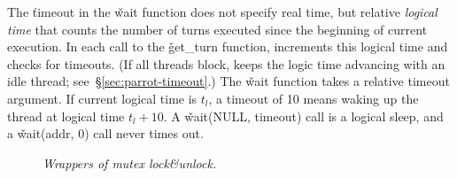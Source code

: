 
The \v{timeout} in the \v{wait} function does not specify real time, but relative \emph{logical time} that
counts the number of turns executed since the beginning of current
execution.  In each call to the \v{get\_turn} function, \parrot increments this logical
time and checks for timeouts. 
(If all threads block, \parrot keeps the logic time advancing with an idle
thread; see~\S\ref{sec:parrot-timeout}.)
The \v{wait} function takes a relative timeout argument.  If
current logical time is $t_l$, a timeout of 10 means waking up the thread
at logical time $t_l + 10$. A \v{wait(NULL, timeout)} 
call is a logical sleep, and a \v{wait(addr, 0)} call never times out.

\begin{figure}[t]
\hspace{1.5in}
\begin{minipage}[t]{.38\textwidth}
\end{minipage}
\vspace{-1 mm}
\caption{{\em Wrappers of \pthread mutex lock\&unlock.}} \label{fig:parrot-lock}
\vspace{-0.0in}
\end{figure}

